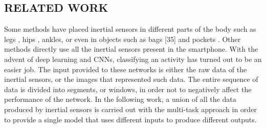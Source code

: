 \subsection{RELATED WORK}
Some methods have placed inertial sensors in different parts of the body 
such as legs \cite{0857651733}, hips \cite{0857651732}, ankles, or even in objects such as bags [35] and 
pockets \cite{0857651720}. Other methods \cite{0857651736} directly use all the inertial sensors present 
in the smartphone. With the advent of deep learning and CNNs, classifying 
an activity has turned out to be an easier job. The input provided to these 
networks is either the raw data of the inertial sensors, or the images that 
represented such data. The entire sequence of data is divided into segments, 
or windows, in order not to negatively affect the performance of the network. 
In the following work, a union of all the data produced by inertial sensors is 
carried out with the multi-task approach in order to provide a single model 
that uses different inputs to produce different outputs.
